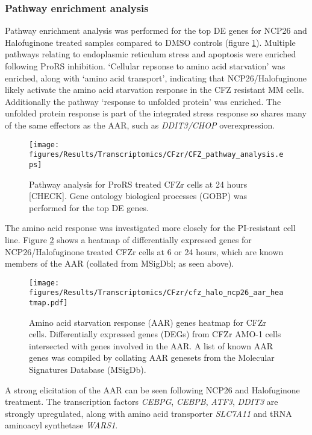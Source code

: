 \subsubsection{Pathway enrichment analysis}
Pathway enrichment analysis was performed for the top DE genes for NCP26 and Halofuginone treated samples compared to DMSO controls (figure \ref{fig:cfz_pathway}).
Multiple pathways relating to endoplasmic reticulum stress and apoptosis were enriched following ProRS inhibition.
`Cellular repsonse to amino acid starvation' was enriched, along with `amino acid transport', indicating that NCP26/Halofuginone likely activate the amino acid starvation response in the CFZ resistant MM cells.
Additionally the pathway `response to unfolded protein' was enriched.
The unfolded protein response is part of the integrated stress response so shares many of the same effectors as the AAR, such as \textit{DDIT3/CHOP} overexpression.

\begin{figure}[htb]
\centering
\texttt{[image: figures/Results/Transcriptomics/CFzr/CFZ\_pathway\_analysis.eps]}
\caption[Pathway analysis for ProRS inhibitor-treated CFZr cells]{Pathway analysis for ProRS treated CFZr cells at 24 hours [CHECK].
Gene ontology biological processes (GOBP) was performed for the top DE genes.
}
\label{fig:cfz_pathway}
\end{figure}
%
The amino acid response was investigated more closely for the PI-resistant cell line.
Figure \ref{fig:cfz_aar_heatmap} shows a heatmap of differentially expressed genes for NCP26/Halofuginone treated CFZr cells at 6 or 24 hours, which are known members of the AAR (collated from MSigDbl; as seen above).

\begin{figure}[p]
\centering
\texttt{[image: figures/Results/Transcriptomics/CFzr/cfz\_halo\_ncp26\_aar\_heatmap.pdf]}
\caption[Amino acid starvation response genes heatmap CFZr cells]{Amino acid starvation response (AAR) genes heatmap for CFZr cells.
Differentially expressed genes (DEGs) from CFZr AMO-1 cells intersected with genes involved in the AAR.
A list of known AAR genes was compiled by collating AAR genesets from the Molecular Signatures Database (MSigDb).
}
\label{fig:cfz_aar_heatmap}
\end{figure}
A strong elicitation of the AAR can be seen following NCP26 and Halofuginone treatment.
The transcription factors \textit{CEBPG}, \textit{CEBPB}, \textit{ATF3}, \textit{DDIT3} are strongly upregulated, along with amino acid transporter \textit{SLC7A11} and tRNA aminoacyl synthetase \textit{WARS1}. 

